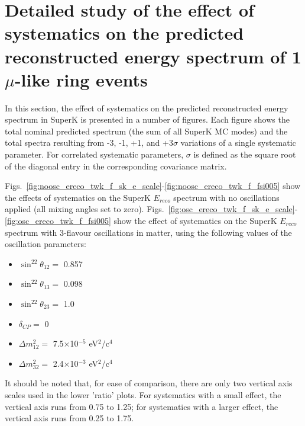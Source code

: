 \clearpage

\section{Detailed study of the effect of systematics on the predicted reconstructed energy spectrum of 1 $\mu$-like ring events}
\label{appendix:spectrum_systematics}

In this section, the effect of systematics on the predicted reconstructed energy spectrum in SuperK is presented in a number of figures.
Each figure shows the total nominal predicted spectrum (the sum of all SuperK MC modes) and the total spectra resulting from -3, -1, +1, 
and +3$\sigma$ variations of a single systematic parameter.
For correlated systematic parameters, $\sigma$ is defined as the square root of the diagonal entry in the corresponding covariance matrix.

Figs.\ \ref{fig:noosc_ereco_twk_f_sk_e_scale}-\ref{fig:noosc_ereco_twk_f_fsi005} show the effects of systematics on the SuperK $E_{reco}$ 
spectrum with no oscillations applied (all mixing angles set to zero).
Figs.\ \ref{fig:osc_ereco_twk_f_sk_e_scale}-\ref{fig:osc_ereco_twk_f_fsi005} show the effect of systematics on the SuperK $E_{reco}$ spectrum 
with 3-flavour oscillations in matter, using the following values of the oscillation parameters:
\begin{itemize}
\item $\sin^22\theta_{12} = $ 0.857
\item $\sin^22\theta_{13} = $ 0.098
\item $\sin^22\theta_{23} = $ 1.0
\item $\delta_{CP} = $        0
\item $\Delta m^2_{12} = $    7.5$\times$10$^{-5}$ eV$^{2}$/c$^{4}$
\item $\Delta m^2_{32} = $    2.4$\times$10$^{-3}$ eV$^{2}$/c$^{4}$
\end{itemize}
It should be noted that, for ease of comparison, there are only two vertical axis scales used in the lower 'ratio' plots. For systematics with a small 
effect, the vertical axis runs from 0.75 to 1.25; for systematics with a larger effect, the vertical axis runs from 0.25 to 1.75.







